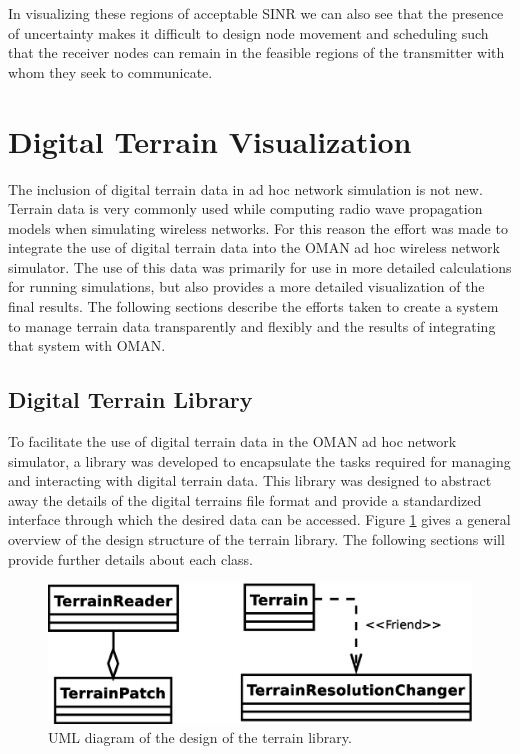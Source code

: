 In visualizing these regions of acceptable SINR we can also see that the presence of uncertainty makes it difficult to design node movement and scheduling such that the receiver nodes can remain in the feasible regions of the transmitter with whom they seek to communicate.


\section{Digital Terrain Visualization}
The inclusion of digital terrain data in ad hoc network simulation is not new.  Terrain data is very commonly used while computing radio wave propagation models when simulating wireless networks.  For this reason the effort was made to integrate the use of digital terrain data into the OMAN ad hoc wireless network simulator.  The use of this data was primarily for use in more detailed calculations for running simulations, but also provides a more detailed visualization of the final results.  The following sections describe the efforts taken to create a system to manage terrain data transparently and flexibly and the results of integrating that system with OMAN.

\subsection{Digital Terrain Library}
To facilitate the use of digital terrain data in the OMAN ad hoc network simulator, a library was developed to encapsulate the tasks required for managing and interacting with digital terrain data.  This library was designed to abstract away the details of the digital terrains file format and provide a standardized interface through which the desired data can be accessed.  Figure \ref{fig:terrain_lib_diagram} gives a general overview of the design structure of the terrain library.  The following sections will provide further details about each class.

\begin{figure}[ht]
\begin{center}
		\includegraphics[scale=0.45]{images/network_vis/terrain_lib_diagram.eps}
\end{center}
\caption{UML diagram of the design of the terrain library.}
\label{fig:terrain_lib_diagram}
\end{figure}

